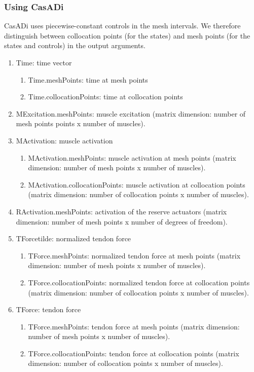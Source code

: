 \documentclass[a4paper,oneside,11pt]{article}
\begin{document}
\subsubsection{Using CasADi}
CasADi uses piecewise-constant controls in the mesh intervals. We therefore distinguish between collocation points (for the states) and mesh points (for the states and controls) in the output arguments.

\begin{enumerate}
	\item Time: time vector
	\begin{enumerate}
	\item Time.meshPoints: time at mesh points
	\item Time.collocationPoints: time at collocation points
	\end{enumerate}
	\item MExcitation.meshPoints: muscle excitation (matrix dimension: number of mesh points points x number of muscles).
	\item MActivation: muscle activation
	\begin{enumerate}
	\item MActivation.meshPoints: muscle activation at mesh points (matrix dimension: number of mesh points x number of muscles).
	\item MActivation.collocationPoints: muscle activation at collocation points (matrix dimension: number of collocation points x number of muscles). 
	\end{enumerate}
	\item RActivation.meshPoints: activation of the reserve actuators (matrix dimension: number of mesh points x number of degrees of freedom).
	\item TForcetilde: normalized tendon force 
	\begin{enumerate}
	\item TForce.meshPoints: normalized tendon force at mesh points (matrix dimension: number of mesh points x number of muscles).
	\item TForce.collocationPoints: normalized tendon force at collocation points (matrix dimension: number of collocation points x number of muscles). 
	\end{enumerate}
	\item TForce: tendon force 
	\begin{enumerate}
	\item TForce.meshPoints: tendon force at mesh points (matrix dimension: number of mesh points x number of muscles).
	\item TForce.collocationPoints: tendon force at collocation points (matrix dimension: number of collocation points x number of muscles). 

\end{enumerate}
\end{enumerate}
\end{document}
